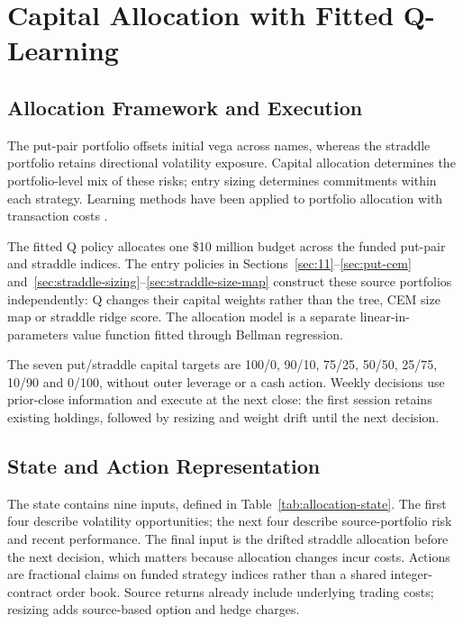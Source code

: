 \section{Capital Allocation with Fitted Q-Learning}\label{sec:allocation}\label{sec:14}

\subsection{Allocation Framework and Execution}

The put-pair portfolio offsets initial vega across names, whereas the straddle portfolio retains directional volatility exposure. Capital allocation determines the portfolio-level mix of these risks; entry sizing determines commitments within each strategy. Learning methods have been applied to portfolio allocation with transaction costs \cite{jiang2017deep}.

The fitted Q policy allocates one \$10 million budget across the funded put-pair and straddle indices. The entry policies in Sections~\ref{sec:11}--\ref{sec:put-cem} and~\ref{sec:straddle-sizing}--\ref{sec:straddle-size-map} construct these source portfolios independently: Q changes their capital weights rather than the tree, CEM size map or straddle ridge score. The allocation model is a separate linear-in-parameters value function fitted through Bellman regression.

The seven put/straddle capital targets are 100/0, 90/10, 75/25, 50/50, 25/75, 10/90 and 0/100, without outer leverage or a cash action. Weekly decisions use prior-close information and execute at the next close: the first session retains existing holdings, followed by resizing and weight drift until the next decision.

\subsection{State and Action Representation}

The state contains nine inputs, defined in Table~\ref{tab:allocation-state}. The first four describe volatility opportunities; the next four describe source-portfolio risk and recent performance. The final input is the drifted straddle allocation before the next decision, which matters because allocation changes incur costs. Actions are fractional claims on funded strategy indices rather than a shared integer-contract order book. Source returns already include underlying trading costs; resizing adds source-based option and hedge charges.

